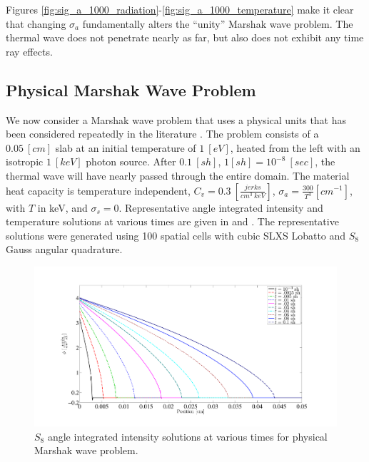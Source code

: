 Figures \ref{fig:sig_a_1000_radiation}-\ref{fig:sig_a_1000_temperature} make it clear that changing $\sigma_a$ fundamentally alters the ``unity'' Marshak wave problem.
The thermal wave does not penetrate nearly as far, but also does not exhibit any time ray effects.

\subsection{Physical Marshak Wave Problem}

We now consider a Marshak wave problem that uses a physical units that has been considered repeatedly in the literature \cite{physical_marshak,time_adaptive_diffusion,negative_trt}.
The problem consists of a $0.05~[cm]$ slab at an initial temperature of $1~[eV]$, heated from the left with an isotropic $1~[keV]$ photon source.
After $0.1~[sh]$, $1[sh]=10^{-8}~[sec]$, the thermal wave will have nearly passed through the entire domain.
The material heat capacity is temperature independent, $C_v = 0.3~[\frac{jerks}{cm^3~keV}]$, $\sigma_a = \frac{300}{T^3} [cm^{-1}]$, with $T$ in keV, and $\sigma_s = 0$.
Representative angle integrated intensity and temperature solutions at various times are given in  and .    The representative solutions were generated using 100 spatial cells with cubic SLXS Lobatto and $S_8$ Gauss angular quadrature.
\begin{figure}[!htp]
\centering
\includegraphics[width=16cm,trim=2in  0.4in 0.5in 0.75in,clip=true]{chapter6_grey_radtran/Dissertation_Data/100C_Physical_Marshak_Wave_Radiation_Times.pdf}
\caption{$S_{8}$ angle integrated intensity solutions at various times for physical Marshak wave problem.}
\label{fig:physical_slices_radiation}
\end{figure}
